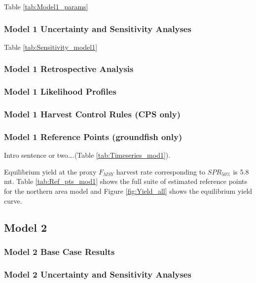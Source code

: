 \documentclass[12pt,]{article}
\begin{document}
Table \ref{tab:Model1_params}

\subsubsection{Model 1 Uncertainty and Sensitivity
Analyses}\label{model-1-uncertainty-and-sensitivity-analyses}

Table \ref{tab:Sensitivity_model1}

\subsubsection{Model 1 Retrospective
Analysis}\label{model-1-retrospective-analysis}

\subsubsection{Model 1 Likelihood
Profiles}\label{model-1-likelihood-profiles}

\subsubsection{Model 1 Harvest Control Rules (CPS
only)}\label{model-1-harvest-control-rules-cps-only}

\subsubsection{Model 1 Reference Points (groundfish
only)}\label{model-1-reference-points-groundfish-only}

Intro sentence or two\ldots{}.(Table \ref{tab:Timeseries_mod1}).

Equilibrium yield at the proxy \(F_{MSY}\) harvest rate corresponding to
\(SPR_{50\%}\) is 5.8 mt. Table \ref{tab:Ref_pts_mod1} shows the full
suite of estimated reference points for the northern area model and
Figure \ref{fig:Yield_all} shows the equilibrium yield curve.

\subsection{Model 2}\label{model-2}

\subsubsection{Model 2 Base Case
Results}\label{model-2-base-case-results}

\subsubsection{Model 2 Uncertainty and Sensitivity
Analyses}\label{model-2-uncertainty-and-sensitivity-analyses}
\end{document}

